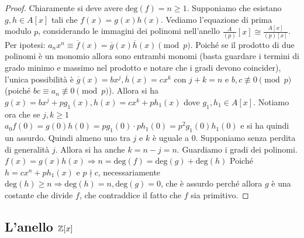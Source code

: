 \begin{proof}
    Chiaramente si deve avere $\text{deg}(f) = n\geq 1$. Supponiamo che esistano $g,h \in A[x]$ tali che $f(x) = g(x)h(x)$. Vediamo l'equazione di prima modulo $p$, considerando le immagini dei polinomi nell'anello $\frac{A}{(p)}[x] \cong \frac{A[x]}{(p)[x]}$. Per ipotesi: $a_nx^n \equiv \overline f(x) = \overline g(x) \overline h(x) \pmod{p}$. Poiché se il prodotto di due polinomi è un monomio allora sono entrambi monomi (basta guardare i termini di grado minimo e massimo nel prodotto e notare che i gradi devono coincider), l'unica possibilità è $\overline g(x)= bx^j, \overline h(x)= cx^k$ con $j+k = n$ e $b,c \not \equiv 0 \pmod{p}$ (poiché $bc \equiv a_n \not \equiv 0 \pmod{p}$). Allora si ha $g(x)= bx^j + pg_1(x), h(x)= cx^k + ph_1(x)$ dove $g_1,h_1 \in A[x]$. Notiamo ora che se $j,k \geq 1$ $a_0 f(0) = g(0)h(0) = pg_1(0)\cdot ph_1(0) = p^2 g_1(0)h_1(0)$ e si ha quindi un assurdo.
    Quindi almeno uno tra $j$ e $k$ è uguale a 0. Supponiamo senza perdita di generalità $j$. Allora si ha anche $k = n-j = n$. Guardiamo i gradi dei polinomi. $f(x) = g(x)h(x) \Rightarrow n = \text{deg}(f) = \text{deg}(g)+\text{deg}(h)$ Poiché $h = cx^n + ph_1(x)$ e $p \nmid c$, necessariamente $\text{deg}(h) \geq n \Rightarrow \text{deg}(h) = n, \text{deg}(g) = 0$, che è assurdo perché allora $g$ è una costante che divide $f$, che contraddice il fatto che $f$ sia primitivo.
\end{proof}

\subsection{L'anello $\mathbb{Z}[x]$}

